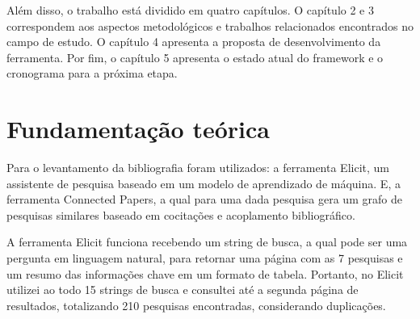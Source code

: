 \documentclass[12pt]{tcc}
\begin{document}
Além disso, o trabalho está dividido em quatro capítulos.
O capítulo 2 e 3 correspondem aos aspectos metodológicos e trabalhos relacionados encontrados no campo de estudo.
O capítulo 4 apresenta a proposta de desenvolvimento da ferramenta.
Por fim, o capítulo 5 apresenta o estado atual do framework e o cronograma para a próxima etapa.


\chapter{Fundamentação teórica}
\label{sec:background}
	\label{sec:fund_teorica}

Para o levantamento da bibliografia foram utilizados: 
a ferramenta Elicit, um assistente de pesquisa baseado em um modelo  de aprendizado de máquina.
E, a ferramenta Connected Papers, a qual para uma dada pesquisa gera um grafo de pesquisas similares baseado em cocitações e acoplamento bibliográfico.

A ferramenta Elicit funciona recebendo um string de busca, a qual pode ser uma pergunta em linguagem natural, para retornar uma página com as 7 pesquisas e um resumo das informações chave em um formato de tabela.
Portanto, no Elicit utilizei ao todo 15 strings de busca e consultei até a segunda página de resultados, totalizando 210 pesquisas encontradas, considerando duplicações.
\end{document}
